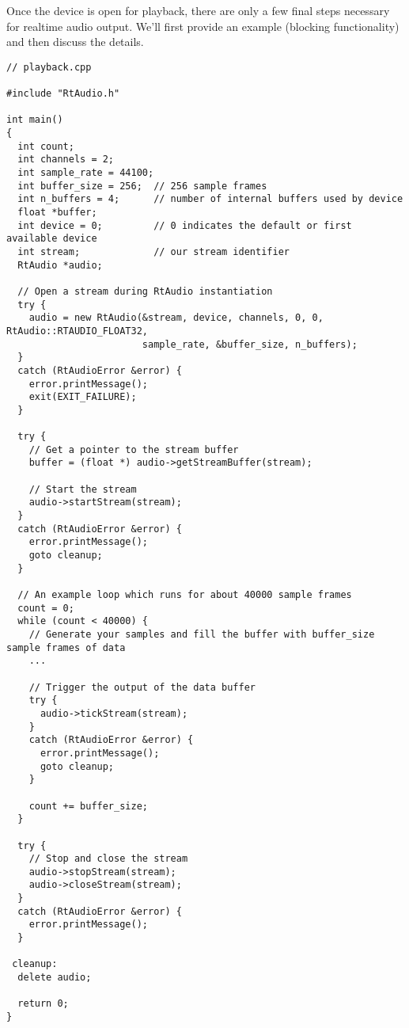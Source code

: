 Once the device is open for playback, there are only a few final steps necessary for realtime audio output. We'll first provide an example (blocking functionality) and then discuss the details.

\footnotesize\begin{verbatim}// playback.cpp

#include "RtAudio.h"

int main()
{
  int count;
  int channels = 2;
  int sample_rate = 44100;
  int buffer_size = 256;  // 256 sample frames
  int n_buffers = 4;      // number of internal buffers used by device
  float *buffer;
  int device = 0;         // 0 indicates the default or first available device
  int stream;             // our stream identifier
  RtAudio *audio;

  // Open a stream during RtAudio instantiation
  try {
    audio = new RtAudio(&stream, device, channels, 0, 0, RtAudio::RTAUDIO_FLOAT32,
                        sample_rate, &buffer_size, n_buffers);
  }
  catch (RtAudioError &error) {
    error.printMessage();
    exit(EXIT_FAILURE);
  }

  try {
    // Get a pointer to the stream buffer
    buffer = (float *) audio->getStreamBuffer(stream);

    // Start the stream
    audio->startStream(stream);
  }
  catch (RtAudioError &error) {
    error.printMessage();
    goto cleanup;
  }

  // An example loop which runs for about 40000 sample frames
  count = 0;
  while (count < 40000) {
    // Generate your samples and fill the buffer with buffer_size sample frames of data
    ...

    // Trigger the output of the data buffer
    try {
      audio->tickStream(stream);
    }
    catch (RtAudioError &error) {
      error.printMessage();
      goto cleanup;
    }

    count += buffer_size;
  }

  try {
    // Stop and close the stream
    audio->stopStream(stream);
    audio->closeStream(stream);
  }
  catch (RtAudioError &error) {
    error.printMessage();
  }

 cleanup:
  delete audio;

  return 0;
}\end{verbatim}\normalsize 


